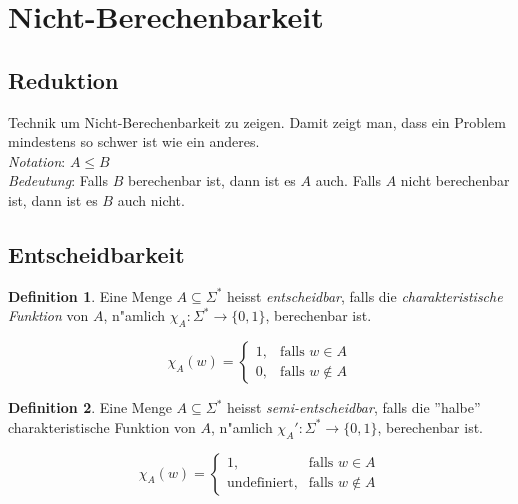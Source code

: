 \documentclass[german, 10pt, a4paper, twocolumn]{scrartcl}
\theoremstyle{definition}
\newtheorem*{definition}{Definition}
\theoremstyle{example}
\begin{document}
\section{Nicht-Berechenbarkeit}

\subsection{Reduktion}

Technik um Nicht-Berechenbarkeit zu zeigen. Damit zeigt man, dass ein Problem mindestens so schwer ist wie ein anderes.\\

\textit{Notation}: $A \leq B$\\

\textit{Bedeutung}: Falls $B$ berechenbar ist, dann ist es $A$ auch. Falls $A$ nicht berechenbar ist, dann ist es $B$ auch nicht.

\subsection{Entscheidbarkeit}

\begin{definition}
	Eine Menge $A \subseteq \Sigma^*$ heisst \textit{entscheidbar}, falls die \textit{charakteristische Funktion} von $A$, n"amlich $\chi_A : \Sigma^* \to \{0,1\}$, berechenbar ist.

	\begin{displaymath}
		 \chi_A (w) = \left \{
		 \begin{array}{ll}
		 	1, &		\text{falls } w \in A\\
			0, &		\text{falls } w \not \in A
		 \end{array}
		 \right .
	\end{displaymath}
\end{definition}

\begin{definition}
	Eine Menge $A \subseteq \Sigma^*$ heisst \textit{semi-entscheidbar}, falls die ''halbe'' charakteristische Funktion von $A$, n"amlich $\chi_A' : \Sigma^* \to \{0,1\}$, berechenbar ist.

	\begin{displaymath}
		 \chi_A (w) = \left \{
		 \begin{array}{ll}
		 	1, &				\text{falls } w \in A\\
			\text{undefiniert}, &		\text{falls } w \not \in A
		 \end{array}
		 \right .
	\end{displaymath}
\end{definition}
\end{document}
